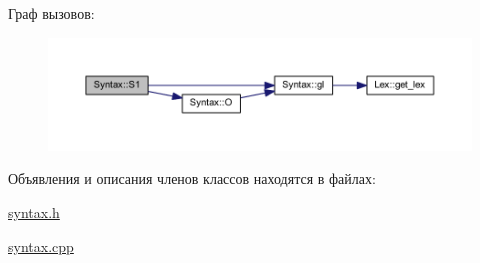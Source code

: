 Граф вызовов\+:
\nopagebreak
\begin{figure}[H]
\begin{center}
\leavevmode
\includegraphics[width=350pt]{class_syntax_ad3bf45fadc4d20146f0a6c85d970d714_cgraph}
\end{center}
\end{figure}




Объявления и описания членов классов находятся в файлах\+:\begin{DoxyCompactItemize}
\item 
\hyperlink{syntax_8h}{syntax.\+h}\item 
\hyperlink{syntax_8cpp}{syntax.\+cpp}\end{DoxyCompactItemize}
